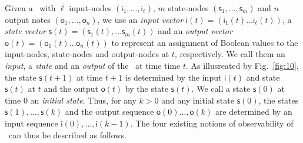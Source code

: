 Given a \BCN\ with $\ell$ input-nodes $(\mathsf{i}_1,\ldots, \mathsf{i}_\ell)$, $m$ state-nodes $(\mathsf{s}_1,\ldots, \mathsf{s}_m)$ and $n$ output notes  $(\mathsf{o}_1,\ldots, \mathsf{o}_n)$,  we use an {\em input vector} $\mathsf{i}(t)=(\mathsf{i}_1(t)\ldots\mathsf{i}_\ell (t))$, a {\em state vector} $\mathsf{s}(t)=(\mathsf{s}_1(t), \ldots \mathsf{s}_m(t))$ and an {\em output  vector} $\mathsf{o}(t)=(\mathsf{o}_1(t) \ldots \mathsf{o}_n(t))$  to represent an assignment of Boolean values to the  input-nodes, state-nodes and  output-nodes at $t$, respectively.  We call them an {\em input}, a {\em state} and an {\em output} of the \BCN\ at time time $t$. As  illusreated by Fig.~\ref{fig:10},  the state $\mathsf{s}(t+1)$ at time $t+1$ is determined by the input   $\mathsf{i}(t)$ and state $\mathsf{s}(t)$ at $t$  and the output   $\mathsf{o}(t)$ by the state  $\mathsf{s}(t)$.  We call a state $\mathsf{s}(0)$ at time $0$ an {\em initial state}. Thus, for any $k>0$ and any  initial state $\mathsf{s}(0)$, the states  $\mathsf{s}(1),\ldots, \mathsf{s}(k)$ and the output sequence $\mathsf{o}(0)\ldots, \mathsf{o}(k)$ are  determined by an  input sequence $\mathsf{i}(0),\ldots, \mathsf{i}(k-1)$.
%
The four existing notions of observability of \BCNs\ can thus be described as follows. 
